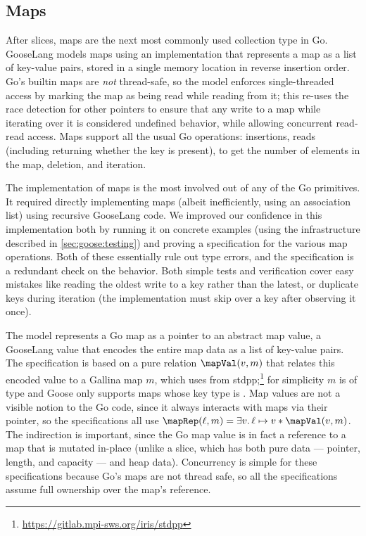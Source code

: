 \subsection{Maps}%
\label{sec:goose:maps}


After slices, maps are the next most commonly used collection type in
Go. GooseLang models maps using an implementation that represents a map as a
list of key-value pairs, stored in a single memory location in reverse insertion
order. Go's builtin maps are
\emph{not} thread-safe, so the model enforces single-threaded access by
marking the map as being read while reading from it; this re-uses the
race detection for other pointers to ensure that any write to a map while iterating
over it is considered
undefined behavior, while allowing concurrent read-read access. Maps
support all the usual Go operations: insertions, reads (including returning
whether the key is present),  to get the number of elements
in the map, deletion, and iteration.

The implementation of maps is the most involved out of any of the Go
primitives. It required directly implementing maps (albeit
inefficiently, using an association list) using recursive GooseLang
code. We improved our confidence in this
implementation both by running it on concrete examples (using the infrastructure
described in \cref{sec:goose:testing}) and proving a specification for the
various map operations. Both of these
essentially rule out type errors,
and the specification is a redundant check on the behavior. Both simple tests and verification
cover easy mistakes like reading the oldest write to a key rather than
the latest, or duplicate keys during iteration (the implementation must
skip over a key after observing it once).

The model represents
a Go map as a pointer to an abstract map value, a GooseLang value
that encodes the entire map data as a list of key-value pairs. The
specification is based on a pure relation $\mapVal(v, m)$ that relates
this encoded value to a Gallina map $m$, which uses  from
stdpp;\footnote{\url{https://gitlab.mpi-sws.org/iris/stdpp}}
for simplicity $m$ is of type  and Goose only supports
maps whose key type is .
Map values are not a visible notion to the Go code, since
it always interacts with maps via their pointer, so the specifications
all use $\mapRep(\ell, m) = \exists v.\, \ell \mapsto v * \mapVal(v, m)$. The
indirection is important, since the Go map value
 is in fact a reference to a map that is
mutated in-place (unlike a slice, which has both pure data --- pointer,
length, and capacity --- and heap data). Concurrency is simple for these
specifications because Go's maps are not thread safe, so all the specifications
assume full ownership over the map's reference.

